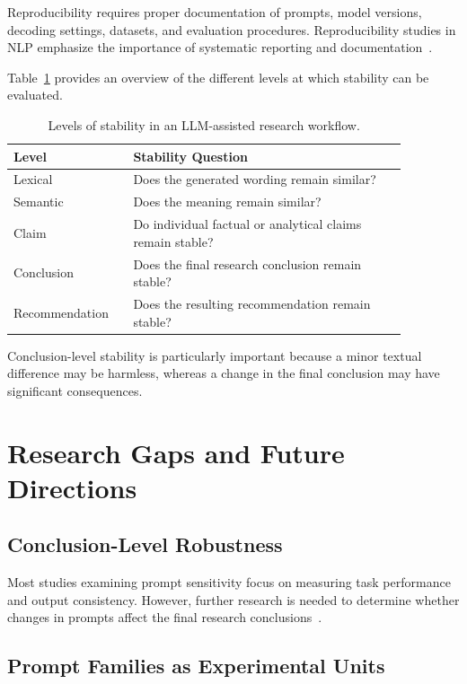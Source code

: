 \documentclass[acmsmall,screen,review]{acmart}
\begin{document}
Reproducibility requires proper documentation of prompts, model versions, decoding settings, datasets, and evaluation procedures. Reproducibility studies in NLP emphasize the importance of systematic reporting and documentation~\cite{magnusson2023}.

Table~\ref{tab:stability} provides an overview of the different levels at which stability can be evaluated.

\begin{table}[t]
\caption{Levels of stability in an LLM-assisted research workflow.}
\label{tab:stability}
\centering
\begin{tabular}{p{0.25\linewidth}p{0.62\linewidth}}
\toprule
Level & Stability Question \\
\midrule
Lexical & Does the generated wording remain similar? \\
Semantic & Does the meaning remain similar? \\
Claim & Do individual factual or analytical claims remain stable? \\
Conclusion & Does the final research conclusion remain stable? \\
Recommendation & Does the resulting recommendation remain stable? \\
\bottomrule
\end{tabular}
\end{table}

Conclusion-level stability is particularly important because a minor textual difference may be harmless, whereas a change in the final conclusion may have significant consequences.

\section{Research Gaps and Future Directions}
\label{sec:gaps}

\subsection{Conclusion-Level Robustness}

Most studies examining prompt sensitivity focus on measuring task performance and output consistency. However, further research is needed to determine whether changes in prompts affect the final research conclusions~\cite{zhuo2024,errica2025}.

\subsection{Prompt Families as Experimental Units}
\end{document}
